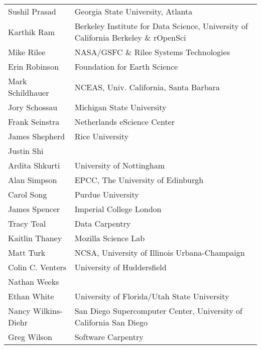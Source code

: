 \documentclass[11pt, oneside]{amsart}
\begin{document}
{\begin{longtable}{ll}
\\ Sushil Prasad         &  Georgia State University, Atlanta
\\ Karthik Ram           &  Berkeley Institute for Data Science, University of California Berkeley \& rOpenSci
\\ Mike Rilee            &  NASA/GSFC \& Rilee Systems Technologies
\\ Erin Robinson         &  Foundation for Earth Science
\\ Mark Schildhauer      &  NCEAS, Univ. California, Santa Barbara
\\ Jory Schossau         &  Michigan State University
\\ Frank Seinstra        &  Netherlands eScience Center
\\ James Shepherd        &  Rice University
\\ Justin Shi
\\ Ardita Shkurti        &  University of Nottingham
\\ Alan Simpson          &  EPCC, The University of Edinburgh
\\ Carol Song            &  Purdue University
\\ James Spencer         &  Imperial College London
\\ Tracy Teal            &  Data Carpentry
\\ Kaitlin Thaney        &  Mozilla Science Lab
\\ Matt Turk             &  NCSA, University of Illinois Urbana-Champaign
\\ Colin C. Venters      &  University of Huddersfield
\\ Nathan Weeks
\\ Ethan White           &  University of Florida/Utah State University
\\ Nancy Wilkins-Diehr   &  San Diego Supercomputer Center, University of California San Diego
\\ Greg Wilson           &  Software Carpentry
\end{longtable}
}




\end{document}
